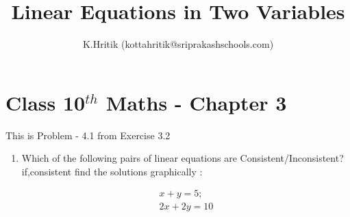 \documentclass[12pt]{article}
\title{Linear Equations in Two Variables}
\author{K.Hritik (kottahritik@sriprakashschools.com)}
\begin{document}
\maketitle
\section*{Class 10$^{th}$ Maths - Chapter 3}
This is Problem - 4.1 from Exercise 3.2
\begin{enumerate}
\item Which of the following pairs of linear equations are Consistent/Inconsistent?if,consistent find the solutions graphically :

\begin{align}
x+y=5;\\
2x+2y=10
\end{align}

\end{enumerate}
\end{document}

